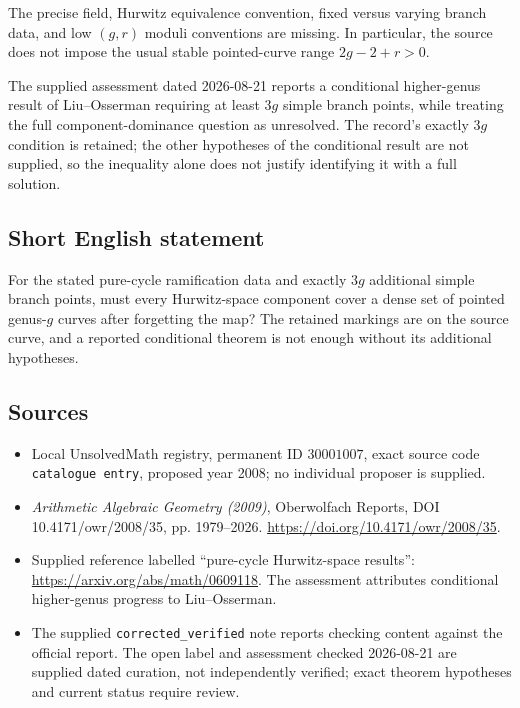 \documentclass[11pt]{article}
\begin{document}
The precise field, Hurwitz equivalence convention, fixed versus varying branch data, and low \((g,r)\) moduli conventions are missing. In particular, the source does not impose the usual stable pointed-curve range \(2g-2+r>0\).

The supplied assessment dated 2026-08-21 reports a conditional higher-genus result of Liu--Osserman requiring at least \(3g\) simple branch points, while treating the full component-dominance question as unresolved. The record's exactly \(3g\) condition is retained; the other hypotheses of the conditional result are not supplied, so the inequality alone does not justify identifying it with a full solution.
\subsection{Short English statement}
For the stated pure-cycle ramification data and exactly \(3g\) additional simple branch points, must every Hurwitz-space component cover a dense set of pointed genus-\(g\) curves after forgetting the map? The retained markings are on the source curve, and a reported conditional theorem is not enough without its additional hypotheses.
\subsection{Sources}
\begin{itemize}
\item Local UnsolvedMath registry, permanent ID \(30001007\), exact source code \texttt{catalogue entry}, proposed year 2008; no individual proposer is supplied.
\item \emph{Arithmetic Algebraic Geometry (2009)}, Oberwolfach Reports, DOI 10.4171/owr/2008/35, pp. 1979--2026. \url{https://doi.org/10.4171/owr/2008/35}.
\item Supplied reference labelled ``pure-cycle Hurwitz-space results'': \url{https://arxiv.org/abs/math/0609118}. The assessment attributes conditional higher-genus progress to Liu--Osserman.
\item The supplied \texttt{corrected\_verified} note reports checking content against the official report. The open label and assessment checked 2026-08-21 are supplied dated curation, not independently verified; exact theorem hypotheses and current status require review.
\end{itemize}
\end{document}
